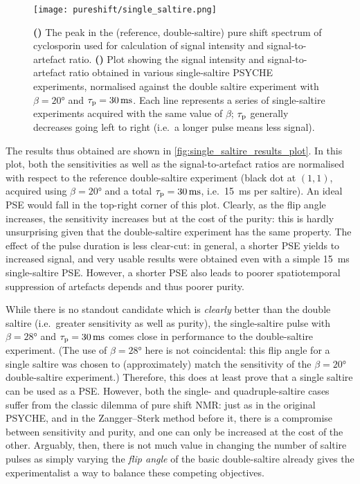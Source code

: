 \begin{figure}[htb]
    \centering
    \texttt{[image: pureshift/single\_saltire.png]}%
    {\label{fig:single_saltire_results_spec}}%
    {\label{fig:single_saltire_results_plot}}%
    \caption[Single-saltire PSYCHE results]{
        \textbf{()} The peak in the (reference, double-saltire) pure shift spectrum of cyclosporin used for calculation of signal intensity and signal-to-artefact ratio.
        \textbf{()} Plot showing the signal intensity and signal-to-artefact ratio obtained in various single-saltire PSYCHE experiments, normalised against the double saltire experiment with $\beta = \ang{20}$ and $\taup = \qty{30}{\ms}$.
        Each line represents a series of single-saltire experiments acquired with the same value of $\beta$; $\tau_\mathrm{p}$ generally decreases going left to right (i.e.\ a longer pulse means less signal). 
    }
    \label{fig:single_saltire_results}
\end{figure}

The results thus obtained are shown in \cref{fig:single_saltire_results_plot}.
In this plot, both the sensitivities as well as the signal-to-artefact ratios are normalised with respect to the reference double-saltire experiment (black dot at $(1, 1)$, acquired using $\beta = \ang{20}$ and a total $\taup = \qty{30}{\ms}$, i.e.\ \qty{15}{\ms} per saltire).
An ideal PSE would fall in the top-right corner of this plot.
Clearly, as the flip angle increases, the sensitivity increases but at the cost of the purity: this is hardly unsurprising given that the double-saltire experiment has the same property.
The effect of the pulse duration is less clear-cut: in general, a shorter PSE yields to increased signal, and very usable results were obtained even with a simple \qty{15}{\ms} single-saltire PSE.
However, a shorter PSE also leads to poorer spatiotemporal suppression of artefacts depends and thus poorer purity.

While there is no standout candidate which is \textit{clearly} better than the double saltire (i.e.\ greater sensitivity as well as purity), the single-saltire pulse with $\beta = \ang{28}$ and $\taup = \qty{30}{\ms}$ comes close in performance to the double-saltire experiment.
(The use of $\beta = \ang{28}$ here is not coincidental: this flip angle for a single saltire was chosen to (approximately) match the sensitivity of the $\beta = \ang{20}$ double-saltire experiment.)
Therefore, this does at least prove that a single saltire can be used as a PSE.
However, both the single- and quadruple-saltire cases suffer from the classic dilemma of pure shift NMR: just as in the original PSYCHE, and in the Zangger--Sterk method before it, there is a compromise between sensitivity and purity, and one can only be increased at the cost of the other.
Arguably, then, there is not much value in changing the number of saltire pulses as simply varying the \textit{flip angle} of the basic double-saltire already gives the experimentalist a way to balance these competing objectives.
